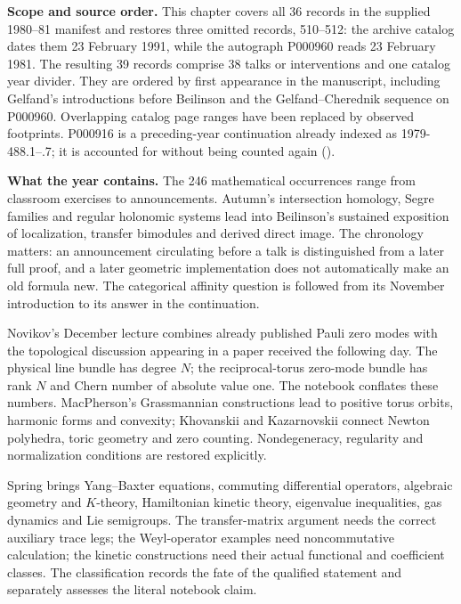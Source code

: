 \noindent\textbf{Scope and source order.}
This chapter covers all 36 records in the supplied 1980--81 manifest and restores three omitted records, 510--512: the archive catalog dates them 23 February 1991, while the autograph P000960 reads 23 February 1981. The resulting 39 records comprise 38 talks or interventions and one catalog year divider. They are ordered by first appearance in the manuscript, including Gelfand's introductions before Beilinson and the Gelfand--Cherednik sequence on P000960. Overlapping catalog page ranges have been replaced by observed footprints. P000916 is a preceding-year continuation already indexed as 1979-488.1--.7; it is accounted for without being counted again (\citealp{mccme2026gelfand}).

\noindent\textbf{What the year contains.}
The 246 mathematical occurrences range from classroom exercises to announcements. Autumn's intersection homology, Segre families and regular holonomic systems lead into Beilinson's sustained exposition of localization, transfer bimodules and derived direct image. The chronology matters: an announcement circulating before a talk is distinguished from a later full proof, and a later geometric implementation does not automatically make an old formula new. The categorical affinity question is followed from its November introduction to its answer in the continuation.

Novikov's December lecture combines already published Pauli zero modes with the topological discussion appearing in a paper received the following day. The physical line bundle has degree \(N\); the reciprocal-torus zero-mode bundle has rank \(N\) and Chern number of absolute value one. The notebook conflates these numbers. MacPherson's Grassmannian constructions lead to positive torus orbits, harmonic forms and convexity; Khovanskii and Kazarnovskii connect Newton polyhedra, toric geometry and zero counting. Nondegeneracy, regularity and normalization conditions are restored explicitly.

Spring brings Yang--Baxter equations, commuting differential operators, algebraic geometry and \(K\)-theory, Hamiltonian kinetic theory, eigenvalue inequalities, gas dynamics and Lie semigroups. The transfer-matrix argument needs the correct auxiliary trace legs; the Weyl-operator examples need noncommutative calculation; the kinetic constructions need their actual functional and coefficient classes. The classification records the fate of the qualified statement and separately assesses the literal notebook claim.


